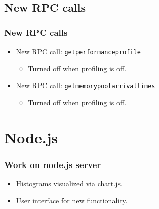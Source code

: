 \subsection{New RPC calls}
\begin{frame}[fragile]
\frametitle{New RPC calls}
\begin{itemize}
\item New RPC call: \verb|getperformanceprofile|
\begin{itemize}
	\item Turned off when profiling is off.
	
\end{itemize}
\item New RPC call: \verb|getmemorypoolarrivaltimes|
\begin{itemize}
	\item Turned off when profiling is off.
\end{itemize}
\end{itemize}
\end{frame}

\section{Node.js}
\begin{frame}
\frametitle{Work on node.js server}
\begin{itemize}
\item Histograms visualized via chart.js.
\item User interface for new functionality.
\end{itemize}
\end{frame}

